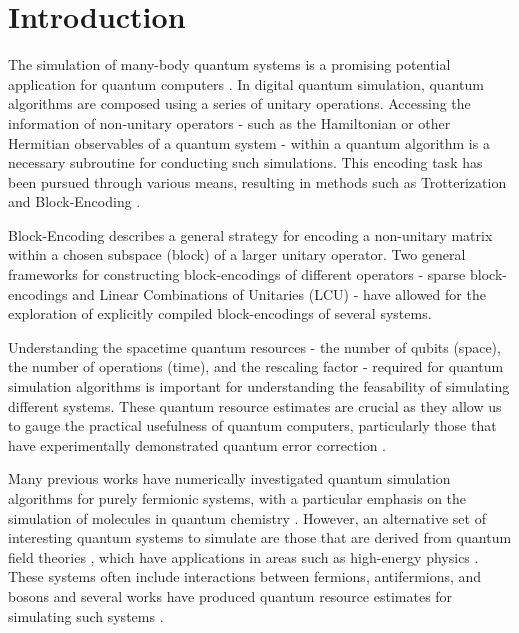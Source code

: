 \section{Introduction}
\label{sec:intro}

The simulation of many-body quantum systems is a promising potential application for quantum computers \cite{feynman2018simulating}.
In digital quantum simulation, quantum algorithms are composed using a series of unitary operations.
Accessing the information of non-unitary operators - such as the Hamiltonian or other Hermitian observables of a quantum system - within a quantum algorithm is a necessary subroutine for conducting such simulations.
This encoding task has been pursued through various means, resulting in methods such as Trotterization \cite{suzuki1976generalized,hatano2005finding,lie1893theorie,trotter1959product,childs2021theory} and Block-Encoding \cite{lin2022lecture, poulin2018quantum, low2019hamiltonian}.

Block-Encoding describes a general strategy for encoding a non-unitary matrix within a chosen subspace (block) of a larger unitary operator.
Two general frameworks for constructing block-encodings of different operators - sparse block-encodings \cite{berry2009black, childs2009universal, lin2022lecture} and Linear Combinations of Unitaries (LCU) \cite{childs2012hamiltonian} - have allowed for the exploration of explicitly compiled block-encodings of several systems.

Understanding the spacetime quantum resources - the number of qubits (space), the number of operations (time), and the rescaling factor - required for quantum simulation algorithms is important for understanding the feasability of simulating different systems.
These quantum resource estimates are crucial as they allow us to gauge the practical usefulness of quantum computers, particularly those that have experimentally demonstrated quantum error correction \cite{bluvstein2024logical, acharya2024quantum}.

Many previous works have numerically investigated quantum simulation algorithms for purely fermionic systems, with a particular emphasis on the simulation of molecules in quantum chemistry \cite{aspuru2005simulated, peruzzo2014variational, babbush2014adiabatic, o2016scalable, babbush2018encoding, google2020hartree, lee2021even, kivlichan2020improved, campbell2021early}.
However, an alternative set of interesting quantum systems to simulate are those that are derived from quantum field theories \cite{Peskin:1995ev, jordan2012quantum} , which have applications in areas such as high-energy physics \cite{bauer2023quantum}.
These systems often include interactions between fermions, antifermions, and bosons and several works have produced quantum resource estimates for simulating such systems \cite{camps2024explicit, liu2024efficient, rhodes2024exponential}.

